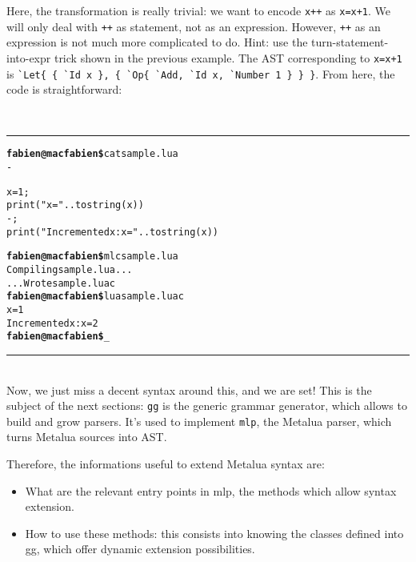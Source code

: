 Here, the transformation is really trivial: we want to encode
\verb|x++| as \verb|x=x+1|. We will only deal with \verb|++| as
statement, not as an expression. However, \verb|++| as an expression is not
much more complicated to do. Hint: use the turn-statement-into-expr
trick shown in the previous example. The AST corresponding to
\verb|x=x+1| is 
\verb|`Let{ { `Id x }, { `Op{ `Add, `Id x, `Number 1 } } }|. From
here, the code is straightforward:

~\\\hrule
\begin{alltt}
{\bf{}fabien@macfabien\$} cat sample.lua
-

x = 1;                  
print ("x = " .. tostring (x))
-; 
print ("Incremented x: x = " .. tostring (x))

{\bf{}fabien@macfabien\$} mlc sample.lua
Compiling sample.lua...
...Wrote sample.luac
{\bf{}fabien@macfabien\$} lua sample.luac
x = 1
Incremented x: x = 2
{\bf{}fabien@macfabien\$} _
\end{alltt}
\hrule~\\

Now, we just miss a decent syntax around this, and we are set! This is
the subject of the next sections: \verb|gg| is the generic grammar
generator, which allows to build and grow parsers. It's used to
implement \verb|mlp|, the Metalua parser, which turns Metalua sources
into AST.

Therefore, the informations useful to extend Metalua syntax are:

\begin{itemize}
\item What are the relevant entry points in mlp, the methods which
  allow syntax extension.
\item How to use these methods: this consists into knowing the classes
  defined into gg, which offer dynamic extension possibilities.
\end{itemize}
